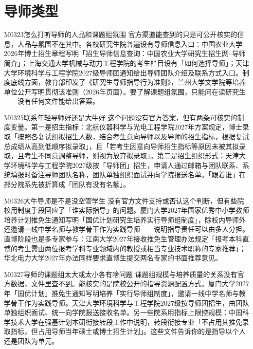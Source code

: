 \section{导师类型}
\begin{qa}{M0323}{怎么打听导师的人品和课题组氛围}
官方渠道能查到的只是可公开核实的信息，人品与氛围不在其中。各校研究生院普遍设有导师信息入口：中国农业大学2026年博士招生章程写明「招生导师信息查询：中国农业大学研究生招生网--导师简介」；上海交通大学机械与动力工程学院的考生栏目设有「如何选择导师」；天津大学环境科学与工程学院2027级导师团通知给出导师团队介绍及联系方式入口。制度底线方面，教育部印发了《研究生导师指导行为准则》，兰州大学文学院等培养单位公开写明贯彻该准则（2026年页面）。要了解课题组氛围，只能问在读研究生——没有任何文件能给出答案。
\end{qa}

\begin{qa}{M0325}{联系年轻导师好还是大牛好}
这个问题没有官方答案，但有两条可核实的制度变量。第一是招生指标：北航仪器科学与光电工程学院2027年方案规定，博士录取「按照各复试组拟招生人数，结合考生意向导师以及导师的招生指标，根据复试总成绩从高到低顺序拟录取」，且「若考生因意向导师招生指标等原因未被其拟录取，且考生不同意调整导师，则视为放弃拟录取」。第二是招生组织形式：天津大学环境科学与工程学院2027级按「导师团」招生，申请人通过邮箱与团队联系、系统填报时备注导师团队名称，团队单独组织面试并向学院报送名单。「跟着谁」在部分院系先被折算成「团队有没有名额」。
\end{qa}

\begin{qa}{M0326}{大牛导师是不是没空管学生}
没有官方文件支持或否认这个判断，但有些院校用制度手段回应了「谁实际指导」的问题。厦门大学2027年国家优秀中小学教师培养计划推免生通知写明「国优计划研究生培养实行导师组制度」，除校内导师外还邀请一线中学名师与教学骨干作为实践导师——说明指导责任可以由多人分担。直博阶段也是多专家参与：江南大学2027年接收推免生管理办法规定「报考本科直博的考生需由两位报考学科专业领域内的教授或相当专业技术职称的专家推荐」；华北电力大学2027年办法同样要求直博生提交两名专家的书面推荐意见。
\end{qa}

\begin{qa}{M0327}{导师的课题组太大或太小各有啥问题}
课题组规模与培养质量的关系没有官方数据，文件里查不到。能核实的是院校公开的指导资源配置方式。厦门大学2027年「国优计划」推免生通知写明培养「实行导师组制度」，邀请一线中学名师与教学骨干作为实践导师。天津大学环境科学与工程学院2027级按导师团招生，由团队单独组织面试、统一向学院报送接收名单。另一些院系用指标上限控规模：中国科学技术大学在强基计划本研衔接转段工作中说明，转段衔接专业「不占用其推免录取指标，但占用导师当年硕士或博士招生计划」。这些文件告诉你的是指导以个人还是团队为单元。
\end{qa}

